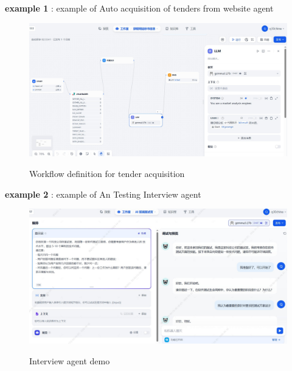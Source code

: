 \textbf{example 1} : example of Auto acquisition of tenders from website agent

\begin{figure}[H]
    \begin{center}
        \includegraphics[width=.95\linewidth]{res/dify-tender.jpg}\\
        \caption{Workflow definition for tender acquisition }\label{dify-tender}
    \end{center}
\end{figure}

\textbf{example 2 }: example of An Testing Interview agent

\begin{figure}[H]
    \begin{center}
        \includegraphics[width=.95\linewidth]{res/dify-interview.jpg}\\
        \caption{Interview agent demo }\label{dify-interview}
    \end{center}
\end{figure}



